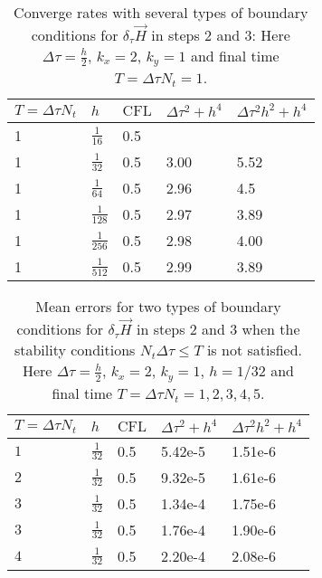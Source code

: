 \documentclass[12pt,reqno]{amsart}
\theoremstyle{definition}
\numberwithin{equation}{section}
\begin{document}
		
		\begin{table} [h!]
			\centering
			\begin{tabular}{|p{2cm}|p{0.7cm}|p{0.7cm}|p{2cm}|p{2cm}|}
				\hline
			$T=\Delta \tau N_t$&	$h$ & $\mathrm{CFL}$ &$\Delta \tau^2+h^4$&$\Delta \tau^2h^2+h^4$
				\\ [0.5ex] 
				\hline 
				1&$\frac{1}{16}$ & 0.5& &  \\[0.5mm]
				1&$\frac{1}{32}$ & 0.5 &3.00 &5.52\\[0.5mm]
				1&$\frac{1}{64}$ & 0.5 & 2.96 &4.5 \\[0.5mm]
				1&$\frac{1}{128}$ & 0.5 &2.97 & 3.89\\[0.5mm]
				1&$\frac{1}{256}$ & 0.5& 2.98 &4.00 \\[0.5mm]
				1&	$\frac{1}{512}$ & 0.5& 2.99 &3.89 \\[0.5mm]
				\hline
			\end{tabular}
			\caption{ Converge rates with several types of boundary conditions for $\delta_\tau \vec{H}$ in steps 2 and 3:	 
				Here $\Delta \tau=\frac{h}{2}$, $k_x=2$, $k_y=1$
				and final time $T=\Delta \tau N_t=1$. }
			\label{table:conv_rates}
			
			
		\end{table}
		\begin{table} [h!]
		\centering
		\begin{tabular}{|p{2cm}|p{0.7cm}|p{0.7cm}|p{2cm}|p{2cm}|}
			\hline
			$T=\Delta \tau N_t$ &$h$& $\mathrm{CFL}$ &$\Delta \tau^2+h^4$&$\Delta \tau^2h^2+h^4$
			\\ [0.5ex]
\hline 
						$1$ &$\frac{1}{32}$& 0.5&5.42e-5 &1.51e-6  \\[0.5mm]
			$2$ &$\frac{1}{32}$& 0.5 &9.32e-5&1.61e-6\\[0.5mm]
			$3$ &$\frac{1}{32}$& 0.5 & 1.34e-4 &1.75e-6 \\[0.5mm]
			$3$ &$\frac{1}{32}$& 0.5 &1.76e-4 & 1.90e-6\\[0.5mm]
			$4$ &$\frac{1}{32}$& 0.5& 2.20e-4 &2.08e-6 \\[0.5mm]
			\hline
		\end{tabular}
		\caption{ Mean errors for two types of boundary conditions for $\delta_\tau \vec{H}$ in steps 2 and 3 when the stability conditions $N_t\Delta \tau\leq T$ is not satisfied.	 
			Here $\Delta \tau=\frac{h}{2}$, $k_x=2$, $k_y=1$, $h=1/32$
			and final time $T=\Delta \tau N_t=1,2,3,4,5$. }
		\label{table:conv_rates4}
		
		
	\end{table}
\end{document}

